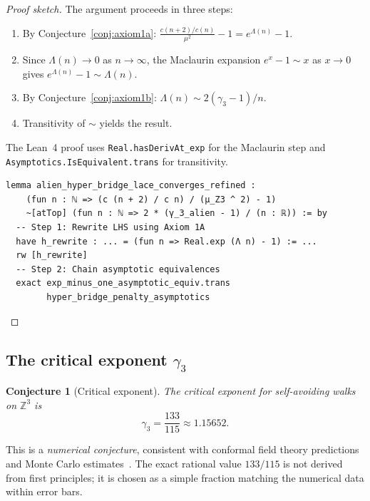 \documentclass[11pt,a4paper]{article}
\newtheorem{conjecture}{Conjecture}[section]
\theoremstyle{definition}
\theoremstyle{remark}
\begin{document}
\begin{proof}[Proof sketch]
The argument proceeds in three steps:
\begin{enumerate}
  \item By Conjecture~\ref{conj:axiom1a}:
        $\frac{c(n+2)/c(n)}{\mu^2} - 1 = e^{\Lambda(n)} - 1$.
  \item Since $\Lambda(n) \to 0$ as $n \to \infty$, the Maclaurin
        expansion $e^x - 1 \sim x$ as $x \to 0$ gives
        $e^{\Lambda(n)} - 1 \sim \Lambda(n)$.
  \item By Conjecture~\ref{conj:axiom1b}:
        $\Lambda(n) \sim 2(\gamma_3 - 1)/n$.
  \item Transitivity of $\sim$ yields the result.
\end{enumerate}
The Lean~4 proof uses \texttt{Real.hasDerivAt\_exp} for the
Maclaurin step and \texttt{Asymptotics.IsEquivalent.trans}
for transitivity.
\begin{lstlisting}[language=Lean]
lemma alien_hyper_bridge_lace_converges_refined :
    (fun n : ℕ => (c (n + 2) / c n) / (μ_Z3 ^ 2) - 1)
    ~[atTop] (fun n : ℕ => 2 * (γ_3_alien - 1) / (n : ℝ)) := by
  -- Step 1: Rewrite LHS using Axiom 1A
  have h_rewrite : ... = (fun n => Real.exp (Λ n) - 1) := ...
  rw [h_rewrite]
  -- Step 2: Chain asymptotic equivalences
  exact exp_minus_one_asymptotic_equiv.trans
        hyper_bridge_penalty_asymptotics
\end{lstlisting}
\end{proof}

\subsection{The critical exponent $\gamma_3$}

\begin{conjecture}[Critical exponent]\label{conj:gamma}
The critical exponent for self-avoiding walks on $\mathbb{Z}^3$ is
\begin{equation}
  \gamma_3 = \frac{133}{115} \approx 1.15652.
\end{equation}
\end{conjecture}

This is a \emph{numerical conjecture}, consistent with conformal
field theory predictions and Monte Carlo
estimates~\cite{Clisby2010,CampanelliSimmonsDuffin2024}.
The exact rational value $133/115$ is not derived from first
principles; it is chosen as a simple fraction matching the
numerical data within error bars.

\end{document}
